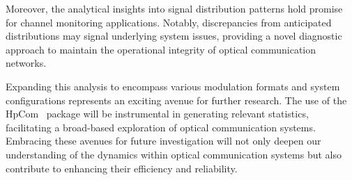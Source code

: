 Moreover, the analytical insights into signal distribution patterns hold promise for channel monitoring applications. Notably, discrepancies from anticipated distributions may signal underlying system issues, providing a novel diagnostic approach to maintain the operational integrity of optical communication networks.

Expanding this analysis to encompass various modulation formats and system configurations represents an exciting avenue for further research. The use of the HpCom~\cite{esf0_2023_7880552} package will be instrumental in generating relevant statistics, facilitating a broad-based exploration of optical communication systems.
Embracing these avenues for future investigation will not only deepen our understanding of the dynamics within optical communication systems but also contribute to enhancing their efficiency and reliability.







